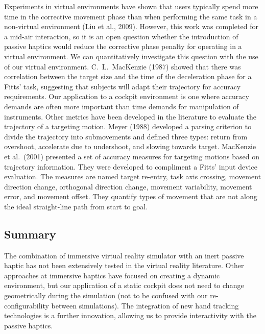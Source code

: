 Experiments in virtual environments have shown that users typically spend more time in the corrective movement phase than when performing the same task in a non-virtual environment (Liu et al., 2009).
However, this work was completed for a mid-air interaction, so it is an open question whether the introduction of passive haptics would reduce the corrective phase penalty for operating in a virtual environment.
We can quantitatively investigate this question with the use of our virtual environment.
C.\ L.\ MacKenzie (1987) showed that there was correlation between the target size and the time of the deceleration phase for a Fitts' task, suggesting that subjects will adapt their trajectory for accuracy requirements.
Our application to a cockpit environment is one where accuracy demands are often more important than time demands for manipulation of instruments.
%
%
Other metrics have been developed in the literature to evaluate the trajectory of a targeting motion.
Meyer (1988) developed a parsing criterion to divide the trajectory into submovements and defined three types: return from overshoot, accelerate due to undershoot, and slowing towards target.
MacKenzie et al.\ (2001) presented a set of accuracy measures for targeting motions based on trajectory information.
They were developed to compliment a Fitts' input device evaluation.
The measures are named target re-entry, task axis crossing, movement direction change, orthogonal direction change, movement variability, movement error, and movement offset.
They quantify types of movement that are not along the ideal straight-line path from start to goal.

\subsection{Summary}
\label{summary}

The combination of immersive virtual reality simulator with an inert passive haptic has not been extensively tested in the virtual reality literature.
Other approaches at immersive haptics have focused on creating a dynamic environment, but our application of a static cockpit does not need to change geometrically during the simulation (not to be confused with our re-configurability between simulations).
The integration of new hand tracking technologies is a further innovation, allowing us to provide interactivity with the passive haptics.

